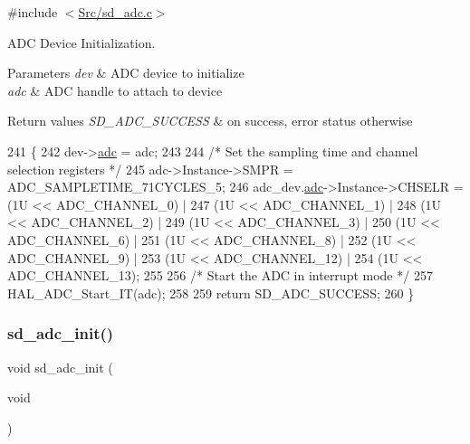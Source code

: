 {\ttfamily \#include $<$\mbox{\hyperlink{sd__adc_8c}{Src/sd\+\_\+adc.\+c}}$>$}



A\+DC Device Initialization. 


\begin{DoxyParams}{Parameters}
{\em dev} & A\+DC device to initialize \\
\hline
{\em adc} & A\+DC handle to attach to device \\
\hline
\end{DoxyParams}

\begin{DoxyRetVals}{Return values}
{\em S\+D\+\_\+\+A\+D\+C\+\_\+\+S\+U\+C\+C\+E\+SS} & on success, error status otherwise \\
\hline
\end{DoxyRetVals}

\begin{DoxyCode}
241 \{
242     dev->\mbox{\hyperlink{structsd__adc__dev_a2701c9711189aaeb5f330e1d4db94c42}{adc}} = adc;
243     
244     \textcolor{comment}{/* Set the sampling time and channel selection registers */}
245     adc->Instance->SMPR = ADC\_SAMPLETIME\_71CYCLES\_5;
246     adc\_dev.\mbox{\hyperlink{structsd__adc__dev_a2701c9711189aaeb5f330e1d4db94c42}{adc}}->Instance->CHSELR = (1U << ADC\_CHANNEL\_0) |
247                 (1U << ADC\_CHANNEL\_1) |
248                 (1U << ADC\_CHANNEL\_2) |
249                 (1U << ADC\_CHANNEL\_3) |
250                 (1U << ADC\_CHANNEL\_6) |
251                 (1U << ADC\_CHANNEL\_8) |
252                 (1U << ADC\_CHANNEL\_9) |
253                 (1U << ADC\_CHANNEL\_12) |
254                 (1U << ADC\_CHANNEL\_13);
255     
256     \textcolor{comment}{/* Start the ADC in interrupt mode */}
257     HAL\_ADC\_Start\_IT(adc);
258     
259     \textcolor{keywordflow}{return} SD\_ADC\_SUCCESS;
260 \}
\end{DoxyCode}
\mbox{\label{group___s_d___a_d_c___functions_ga1a0d46dabe915346e428a46b9f943879}} 
\subsubsection{\texorpdfstring{sd\+\_\+adc\+\_\+init()}{sd\_adc\_init()}}
{\footnotesize\ttfamily void sd\+\_\+adc\+\_\+init (\begin{DoxyParamCaption}\item[{void}]{ }\end{DoxyParamCaption})}



